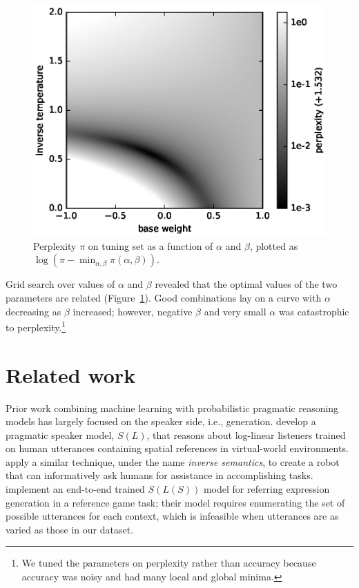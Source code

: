 \documentclass[11pt,letterpaper]{article}
\newcommand{\term}{\textit}
\newcommand{\Listener}{L}
\newcommand{\Speaker}{S}
\renewcommand{\|}{\mid}
\newcommand{\figref}[1]{Figure~\ref{#1}}
\begin{document}
\begin{figure}
\centering
\includegraphics[width=\columnwidth]{figures/alpha_beta.eps}
\caption{Perplexity $\pi$ on tuning set as a function of $\alpha$ and $\beta$, plotted as $\log(\pi - \min_{\alpha,\beta} \pi(\alpha, \beta))$.}
\label{fig:alpha_beta}
\end{figure}

Grid search over values of $\alpha$ and $\beta$ revealed that the optimal values of
the two parameters are related (\figref{fig:alpha_beta}). Good combinations lay on
a curve with $\alpha$ decreasing as $\beta$ increased; however, negative $\beta$ and
very small $\alpha$ was catastrophic to perplexity.\footnote{We tuned the
parameters on perplexity rather than accuracy because accuracy was noisy and had
many local and global minima.}

\section{Related work}

Prior work combining machine learning with probabilistic pragmatic reasoning
models has largely focused on the speaker side, i.e., generation.
 develop a pragmatic speaker model,
$\Speaker(\Listener)$, that reasons about log-linear listeners trained on human
utterances containing spatial references in virtual-world environments.
 apply a similar technique, under the name
\term{inverse semantics}, to create a robot that can informatively ask
humans for assistance in accomplishing tasks.  implement
an end-to-end trained $\Speaker(\Listener(\Speaker))$ model for referring
expression generation in a reference game task; their model requires enumerating
the set of possible utterances for each context, which is infeasible when
utterances are as varied as those in our dataset.
\end{document}
